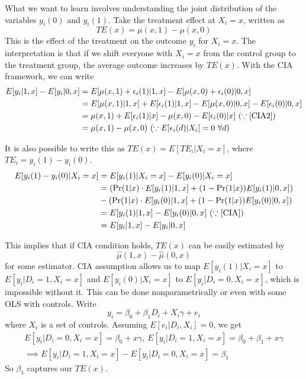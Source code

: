 \documentclass[12pt]{article}
\theoremstyle{definition}
\theoremstyle{property}
\theoremstyle{assumption}
\theoremstyle{example}
\theoremstyle{comment}
\begin{document}
What we want to learn involves understanding the joint distribution of the variables $y_i(0)$ and $y_i(1)$. Take the treatment effect at $X_i=x$, written as
\[
TE(x)=\mu(x,1)-\mu(x, 0)
\]
This is the effect of the treatment on the outcome $y_i$ for $X_i=x$. The interpretation is that if we shift everyone with $X_i=x$ from the control group to the treatment group, the average outcome increases by $TE(x)$. With the CIA framework, we can write
\small{\[
\begin{aligned}
E[y_i|1, x]-E[y_i|0, x]&=E[\mu(x,1)+\epsilon_i(1)|1, x]-E[\mu(x,0)+\epsilon_i(0)|0, x]\\
&=E[\mu(x,1)|1, x]+E[\epsilon_i(1)|1, x]-E[\mu(x,0)|0, x]-E[\epsilon_i(0)|0, x]\\
&=\mu(x,1)+E[\epsilon_i(1)|x]-\mu(x,0)-E[\epsilon_i(0)|x] \ (\because \ref{CIA2})\\
&=\mu(x,1)-\mu(x,0) \ (\because  E[\epsilon_i(d)|X_i]=0  \ \forall d)
\end{aligned}
\]}\normalsize
\par
It is also possible to write this as $TE(x)=E[TE_i|X_i=x]$, where $TE_i=y_i(1)-y_i(0)$. 
\small{\begin{align*}
E[y_i(1)-y_i(0)|X_i=x] &= E[y_i(1)|X_i=x]- E[y_i(0)|X_i=x]\\
&=(\Pr(1|x)\cdot E[y_i(1)|1,x]+(1-\Pr(1|x))E[y_i(1)|0,x])\\
&-(\Pr(1|x)\cdot E[y_i(0)|1,x]+(1-\Pr(1|x))E[y_i(0)|0,x])\\
&=  E[y_i(1)|1,x]- E[y_i(0)|0,x] \ (\because \ref{CIA}) \\
&=  E[y_i|1, x]-E[y_i|0, x]
\end{align*}}\normalsize
\par
This implies that if CIA condition holds, $TE(x)$ can be easily estimated by
\[
\hat{\mu}(1,x)-\hat{\mu}(0,x)
\]
for some estimator. CIA assumption allows us to map $ E[y_i(1)|X_i=x]$ to $ E[y_i|D_i=1, X_i=x]$ and $E[y_i(0)|X_i=x]$ to $ E[y_i|D_i=0, X_i=x]$, which is impossible without it. This can be done nonparametrically or even with some OLS with controls. Write
\[
y_ i =\beta_0+\beta_1D_i+X_i\gamma+e_i
\]
where $X_i$ is a set of controls. Assuming $E[e_i | D_i,X_i]=0$, we get
\begin{gather*}
E[y_i|D_i=0, X_i=x]=\beta_0+x\gamma,\  E[y_i|D_i=1, X_i=x]=\beta_0+\beta_1+x\gamma \\
\implies E[y_i|D_i=1, X_i=x] - E[y_i|D_i=0, X_i=x] = \beta_1
\end{gather*}
So $\beta_1$ captures our $TE(x)$. 
\par
\end{document}
